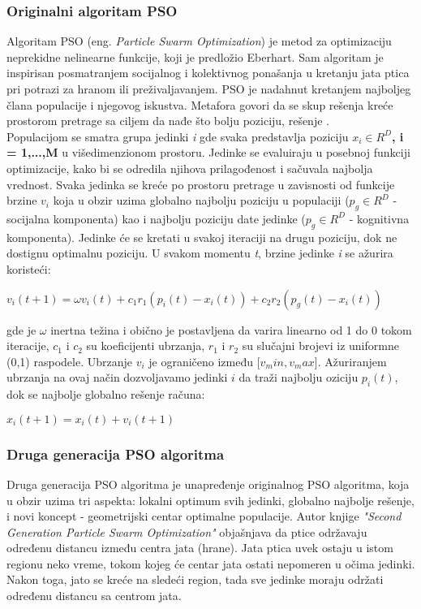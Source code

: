 \documentclass[a4paper]{article}
\begin{document}
{\subsubsection{Originalni algoritam PSO}
\label{subsubsec:opso}
Algoritam PSO (eng. \textit{Particle Swarm Optimization}) je metod za optimizaciju neprekidne nelinearne funkcije, koji je predložio Eberhart.
Sam algoritam je inspirisan posmatranjem socijalnog i kolektivnog ponašanja u kretanju jata ptica pri potrazi za hranom ili preživaljavanjem.
PSO je nadahnut kretanjem najboljeg člana populacije i njegovog iskustva. Metafora govori da se skup rešenja kreće prostorom pretrage sa ciljem da nađe što bolju poziciju, rešenje \cite{hindawi}.
\\
Populacijom se smatra grupa jedinki \textit{i} gde svaka predstavlja poziciju \textbf{\textbf{$x_i \in R^D$, i = 1,...,M}} u višedimenzionom prostoru.
Jedinke se evaluiraju u posebnoj funkciji optimizacije, kako bi se odredila njihova prilagođenost i sačuvala najbolja vrednost. Svaka jedinka se kreće po
prostoru pretrage u zavisnosti od funkcije brzine \textbf{$v_i$} koja u obzir uzima globalno najbolju poziciju u populaciji ($p_g \in R^D$ - socijalna
komponenta) kao i najbolju poziciju date jedinke ($p_g \in R^D$ - kognitivna komponenta). Jedinke će se kretati u svakoj iteraciji na drugu poziciju,
dok ne dostignu optimalnu poziciju. U svakom momentu \textit{t}, brzine jedinke \textit{i} se ažurira koristeći: 
\begin{center}
\textbf\textit{$v_i(t+1) = \omega v_i(t) + c_1 r_1(p_i (t) - x_i (t)) + c_2 r_2 (p_g (t) - x_i (t))$}
\end{center}
gde je $\omega$ inertna težina i obično je postavljena da varira linearno od 1 do 0 tokom iteracije, $c_1$ i $c_2$ su koeficijenti ubrzanja, $r_1$ i $r_2$
su slučajni brojevi iz uniformne (0,1) raspodele. Ubrzanje \textbf{$v_i$} je ograničeno između [$v_min, v_max$]. Ažuriranjem ubrzanja na ovaj 
način dozvoljavamo jedinki $i$ da traži najbolju oziciju \textbf{$p_i(t)$}, dok se najbolje globalno rešenje računa:\cite{hindawi}
\begin{center}
\textbf\textit{$x_i(t+1) = x_i(t) + v_i(t+1)$}
\end{center} 

\subsubsection{Druga generacija PSO algoritma}
\label{subsubsec:sgpso}
Druga generacija PSO algoritma je unapređenje originalnog PSO algoritma, koja u obzir uzima tri aspekta: lokalni optimum svih jedinki,
globalno najbolje rešenje, i novi koncept - geometrijski centar optimalne populacije. Autor knjige \textit{"{}Second Generation Particle Swarm Optimization"} objašnjava da ptice održavaju 
određenu distancu između centra jata (hrane). Jata ptica uvek ostaju u istom regionu neko vreme, tokom kojeg će centar jata ostati
nepomeren u očima jedinki. Nakon toga, jato se kreće na sledeći region, tada sve jedinke moraju održati određenu distancu sa centrom jata.

}
\end{document}

